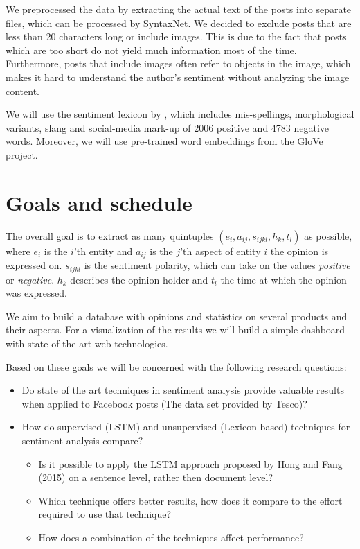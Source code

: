 \documentclass[10pt,a4paper]{article}
\begin{document}
	We preprocessed the data by extracting the actual text of the posts into separate files, which can be processed by SyntaxNet. We decided to exclude posts that are less than 20 characters long or include images. This is due to the fact that posts which are too short do not yield much information most of the time. Furthermore, posts that include images often refer to objects in the image, which makes it hard to understand the author's sentiment without analyzing the image content.
	
	We will use the sentiment lexicon by \cite{Hu:2004:MSC:1014052.1014073}, which includes mis-spellings, morphological variants, slang and social-media mark-up of 2006 positive and 4783 negative words. Moreover, we will use pre-trained word embeddings from the GloVe project.

	\section{Goals and schedule}
	The overall goal is to extract as many quintuples $(e_i, a_{ij}, s_{ijkl}, h_k, t_l)$ as possible, where $e_i$ is the $i$'th entity and $a_{ij}$ is the $j$'th aspect of entity $i$ the opinion is expressed on. $s_{ijkl}$ is the sentiment polarity, which can take on the values \textit{positive} or \textit{negative}. $h_k$ describes the opinion holder and $t_l$ the time at which the opinion was expressed.
	
	We aim to build a database with opinions and statistics on several products and their aspects. For a visualization of the results we will build a simple dashboard with state-of-the-art web technologies.

	Based on these goals we will be concerned with the following research questions:

	\begin{itemize}
	\item Do state of the art techniques in sentiment analysis provide valuable results when applied to Facebook posts (The data set provided by Tesco)?
	\item How do supervised (LSTM) and unsupervised (Lexicon-based) techniques for sentiment analysis compare?
		\begin{itemize}
		\item Is it possible to apply the LSTM approach proposed by Hong and Fang (2015) on a sentence level, rather then document level?
		\item Which technique offers better results, how does it compare to the effort required to use that technique?
		\item How does a combination of the techniques affect performance?
		\end{itemize}
	\end{itemize}
	
\end{document}
